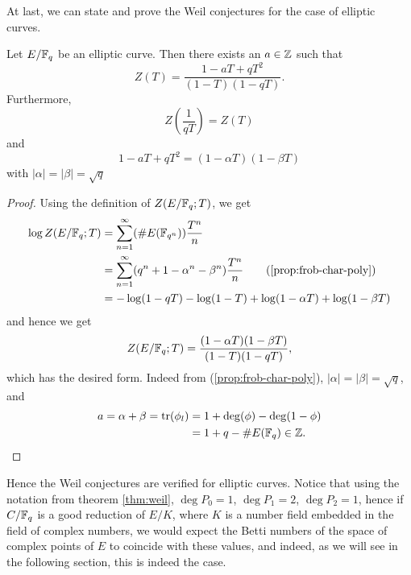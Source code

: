 At last, we can state and prove the Weil conjectures for the case
of elliptic curves.

\begin{theorem}
	\label{thm:weil-elliptic}
	Let $E/\mathbb{F}_q$ be an elliptic curve. Then there exists an $a \in \mathbb{Z}$ such that
	\begin{equation*}
		Z(T) = \frac{1 - aT + qT^2}{(1-T)(1-qT)}.
	\end{equation*}
	Furthermore,
	\begin{equation*}
		Z\left(\frac{1}{qT}\right) = Z(T)
	\end{equation*}
	and
	\begin{equation*}
		1 - aT + qT^2 = (1 - \alpha T)(1 - \beta T)
	\end{equation*}
	with $|\alpha| = |\beta| = \sqrt{q}$
\end{theorem}

\begin{proof}
	Using the definition of $Z(E/\mathbb{F}_q; T)$, we get
	\begin{align*}
		\log Z(E/\mathbb{F}_q; T) &= \sum_{n=1}^\infty (\#E(\mathbb{F}_{q^n}))\frac{T^n}{n}\\
		&= \sum_{n=1}^\infty (q^n + 1 - \alpha^n - \beta^n)\frac{T^n}{n}
		\qquad \textrm{(\ref{prop:frob-char-poly})}\\
		&= -\log(1 - qT) - \log(1 - T) + \log(1 - \alpha T) + \log(1 - \beta T)
	\end{align*}
	and hence we get
	\begin{equation*}
		Z(E/\mathbb{F}_q; T) = \frac{(1 - \alpha T)(1 - \beta T)}{(1 - T)(1 - qT)},
	\end{equation*}
	which has the desired form.
	Indeed from (\ref{prop:frob-char-poly}), 
	$|\alpha| = |\beta| = \sqrt{q}$, and
	\begin{align*}
		a = \alpha + \beta = \operatorname{tr}(\phi_l) &= 1 + \deg(\phi) - \deg(1 - \phi)\\
		&= 1 + q - \#E(\mathbb{F}_q) \in \mathbb{Z}.
	\end{align*}
\end{proof}

Hence the Weil conjectures are verified for elliptic curves. Notice that
using the notation from theorem \ref{thm:weil},
$\deg P_0 = 1$, $\deg P_1 = 2$, $\deg P_2 = 1$, hence if $C/\mathbb{F}_q$ is a good
reduction of $E/K$, where $K$ is a number field embedded in
the field of complex numbers, we would expect
the Betti numbers of the space of complex points of $E$ 
to coincide with these values, and indeed, as we
will see in the following section, this is indeed the case.
